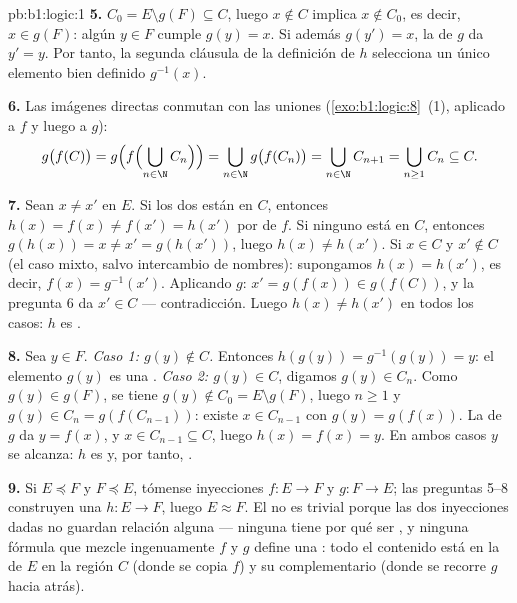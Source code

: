 \begin{solution}{pb:b1:logic:1}
\textbf{5.} $C_0 = E \setminus g(F) \subseteq C$, luego $x \notin C$
implica $x \notin C_0$, es decir, $x \in g(F)$: algún $y \in F$ cumple
$g(y) = x$. Si además $g(y') = x$, la  de $g$ da $y' = y$.
Por tanto, la segunda cláusula de la definición de $h$ selecciona un
único elemento bien definido $g^{-1}(x)$.

\textbf{6.} Las imágenes directas conmutan con las uniones
(\cref{exo:b1:logic:8}~(1), aplicado a $f$ y luego a $g$):
\[
g\bigl(f(C)\bigr)
= g\Bigl(f\Bigl(\bigcup_{n \in \N} C_n\Bigr)\Bigr)
= \bigcup_{n \in \N} g\bigl(f(C_n)\bigr)
= \bigcup_{n \in \N} C_{n+1}
= \bigcup_{n \geq 1} C_n \subseteq C .
\]

\textbf{7.} Sean $x \neq x'$ en $E$. Si los dos están en $C$, entonces
$h(x) = f(x) \neq f(x') = h(x')$ por  de $f$. Si ninguno
está en $C$, entonces $g(h(x)) = x \neq x' = g(h(x'))$, luego
$h(x) \neq h(x')$. Si $x \in C$ y $x' \notin C$ (el caso mixto, salvo
intercambio de nombres): supongamos $h(x) = h(x')$, es decir,
$f(x) = g^{-1}(x')$. Aplicando $g$: $x' = g(f(x)) \in g(f(C))$, y la
pregunta 6 da $x' \in C$ --- contradicción. Luego $h(x) \neq h(x')$ en
todos los casos: $h$ es .

\textbf{8.} Sea $y \in F$. \emph{Caso 1: $g(y) \notin C$.} Entonces
$h(g(y)) = g^{-1}(g(y)) = y$: el elemento $g(y)$ es una
. \emph{Caso 2: $g(y) \in C$}, digamos
$g(y) \in C_n$. Como $g(y) \in g(F)$, se tiene $g(y) \notin C_0 =
E \setminus g(F)$, luego $n \geq 1$ y $g(y) \in C_n = g(f(C_{n-1}))$:
existe $x \in C_{n-1}$ con $g(y) = g(f(x))$. La  de $g$ da
$y = f(x)$, y $x \in C_{n-1} \subseteq C$, luego $h(x) = f(x) = y$. En
ambos casos $y$ se alcanza: $h$ es  y, por tanto, .

\textbf{9.} Si $E \preceq F$ y $F \preceq E$, tómense inyecciones
$f \colon E \to F$ y $g \colon F \to E$; las preguntas 5--8 construyen
una  $h \colon E \to F$, luego $E \approx F$. El  no
es trivial porque las dos inyecciones dadas no guardan relación alguna
--- ninguna tiene por qué ser , y ninguna fórmula que
mezcle ingenuamente $f$ y $g$ define una : todo el contenido
está en la  de $E$ en la región $C$ (donde se copia $f$) y su
complementario (donde se recorre $g$ hacia atrás).


\end{solution}

